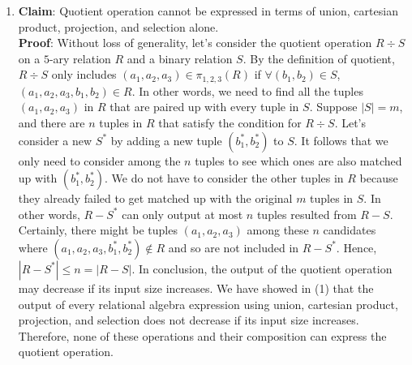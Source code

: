 \begin{enumerate}
  \item \textbf{Claim}: Quotient operation cannot be expressed in terms of union, cartesian product, projection, and selection 
  alone. \\
  \textbf{Proof}: Without loss of generality, let's consider the quotient operation $R \div S$ on a $5$-ary relation $R$ and a binary 
  relation $S$. By the definition of quotient, $R \div S$ only includes $(a_1,a_2,a_3) \in \pi_{1,2,3}(R)$ if $\forall (b_1,b_2) \in S$, 
  $(a_1,a_2,a_3,b_1,b_2) \in R$. In other words, we need to find all the tuples $(a_1,a_2,a_3)$ in $R$ that are paired up with 
  every tuple in $S$. Suppose $|S| = m$, and there are $n$ tuples in $R$ that satisfy the condition for $R \div S$. Let's consider a new 
  $S^*$ by adding a new tuple $(b_1^*,b_2^*)$ to $S$. It follows that we only need to consider among the $n$ tuples to see which ones are also 
  matched up with $(b_1^*,b_2^*)$. We do not have to consider the other tuples in $R$ because they already failed to get matched up with 
  the original $m$ tuples in $S$. In other words, $R - S^*$ can only output at most $n$ tuples resulted from $R - S$. Certainly, there 
  might be tuples $(a_1,a_2,a_3)$ among these $n$ candidates where $(a_1,a_2,a_3,b_1^*,b_2^*) \notin R$ and so are not included 
  in $R - S^*$. Hence, $|R - S^*| \leq n = |R - S|$. In conclusion, the output of the quotient operation may decrease if its input size 
  increases. We have showed in (1) that the output of every relational algebra expression using union, cartesian product, projection, 
  and selection does not decrease if its input size increases. Therefore, none of these operations and their composition can express 
  the quotient operation.
\end{enumerate}